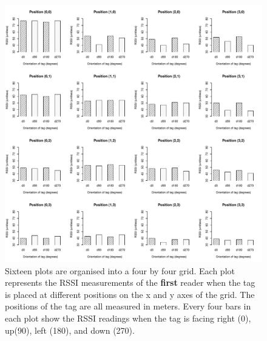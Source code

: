 \documentclass[a4paper,12pt]{article}
\begin{document}
\begin{figure}
	\begin{center}
		\includegraphics[width=1\textwidth]{rssi_distance_grid_r1}
		\caption{Sixteen plots are organised into a four by four grid. Each plot represents the RSSI measurements of the \textbf{first} reader when the tag is placed at different positions on the x and y axes of the grid. The positions of the tag are all measured in meters. Every four bars in each plot show the RSSI readings when the tag is facing right (0\textdegree), up(90\textdegree), left (180\textdegree), and down (270\textdegree).}
	\end{center}
\end{figure}
\end{document}
